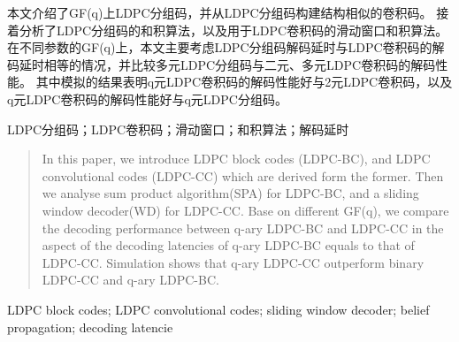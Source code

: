 

\begin{zhaiyao}
本文介绍了GF(q)上LDPC分组码，并从LDPC分组码构建结构相似的卷积码。
接着分析了LDPC分组码的和积算法，以及用于LDPC卷积码的滑动窗口和积算法。
在不同参数的GF(q)上，本文主要考虑LDPC分组码解码延时与LDPC卷积码的解码延时相等的情况，并比较多元LDPC分组码与二元、多元LDPC卷积码的解码性能。
其中模拟的结果表明q元LDPC卷积码的解码性能好与2元LDPC卷积码，以及q元LDPC卷积码的解码性能好与q元LDPC分组码。
\end{zhaiyao}


\begin{guanjianci}
LDPC分组码；LDPC卷积码；滑动窗口；和积算法；解码延时
\end{guanjianci}



\begin{abstract}
In this paper, we introduce LDPC block codes (LDPC-BC), and LDPC convolutional codes (LDPC-CC) which are derived form the former. Then we analyse sum product algorithm(SPA) for LDPC-BC, and a sliding window decoder(WD) for LDPC-CC. Base on different GF(q), we compare the decoding performance between q-ary LDPC-BC and LDPC-CC in the aspect of the decoding latencies of q-ary LDPC-BC equals to that of LDPC-CC. Simulation shows that q-ary LDPC-CC outperform binary LDPC-CC and q-ary LDPC-BC.
\end{abstract}


\begin{keywords}
LDPC block codes; LDPC convolutional codes; sliding window decoder; belief propagation; decoding latencie
\end{keywords} 